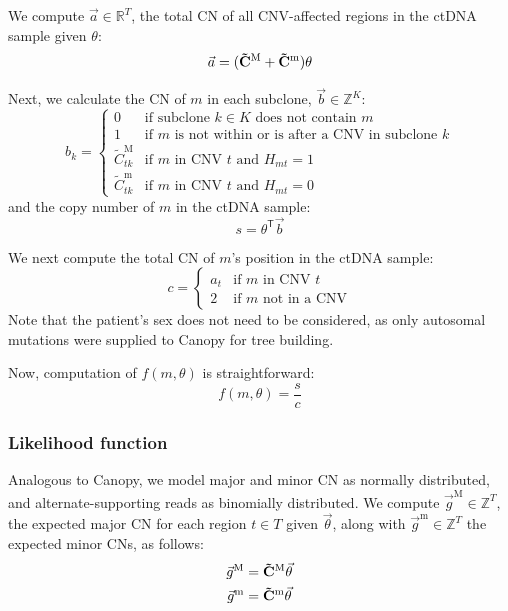 We compute $\vec{a} \in \mathbb{R}^{T}$, the total CN of all CNV-affected regions in the ctDNA sample given $\theta$:
\begin{equation*}
    \vec{a} = (\mathbf{\tilde{C}^\text{M}} + \mathbf{\tilde{C}^\text{m}})\theta
\end{equation*}

Next, we calculate the CN of $m$ in each subclone, $\vec{b} \in \mathbb{Z}^K$:
\begin{equation*}
    b_k = \begin{cases}
        0 & \text{if subclone } k \in K \text{ does not contain } m \\
        1 & \text{if } m \text{ is not within or is after a CNV in subclone } k \\
        \tilde{C}^\text{M}_{tk} & \text{if } m \text{ in CNV } t \text{ and } H_{mt} = 1 \\
        \tilde{C}^\text{m}_{tk} & \text{if } m \text{ in CNV } t \text{ and } H_{mt} = 0
    \end{cases}
\end{equation*}
and the copy number of $m$ in the ctDNA sample:
\begin{equation*}
    s = \theta^\mathsf{T} \vec{b}
\end{equation*}

We next compute the total CN of $m$'s position in the ctDNA sample:
\begin{equation*}
    c = \begin{cases}
        a_t & \text{if } m \text{ in CNV } t \\
        2 & \text{if } m \text{ not in a CNV}
    \end{cases}
\end{equation*}
Note that the patient's sex does not need to be considered, as only autosomal mutations were supplied to Canopy for tree building.

Now, computation of $f(m, \theta)$ is straightforward:
\begin{equation}
    f(m, \theta) = \frac{s}{c}
\end{equation}

\subsubsection{Likelihood function}
Analogous to Canopy, we model major and minor CN as normally distributed, and alternate-supporting reads as binomially distributed. We compute $\vec{g}^\text{M} \in \mathbb{Z}^T$, the expected major CN for each region $t \in T$ given $\vec\theta$, along with $\vec{g}^\text{m} \in \mathbb{Z}^T$ the expected minor CNs, as follows:
\begin{align*}
    \vec{g}^\text{M} &= \mathbf{\tilde{C}^\text{M}} \vec\theta \\
    \vec{g}^\text{m} &= \mathbf{\tilde{C}^\text{m}} \vec\theta
\end{align*}

